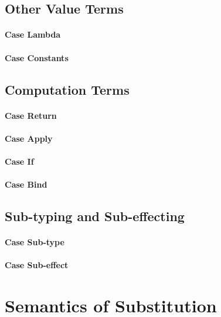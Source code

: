 {    \subsection{Other Value Terms}
    \paragraph{Case Lambda}
    \paragraph{Case Constants}
        
    \subsection{Computation Terms}
    \paragraph{Case Return}
      
    \paragraph{Case Apply}
        
    \paragraph{Case If}
       
    \paragraph{Case Bind}
        
    \subsection{Sub-typing and Sub-effecting}
    \paragraph{Case Sub-type}
        
    \paragraph{Case Sub-effect}
    
    \section{Semantics of Substitution}
}
